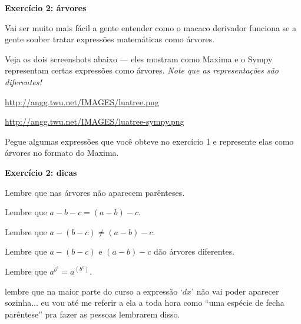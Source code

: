 \documentclass[oneside,12pt]{article}
\begin{document}
\newpage


{\bf Exercício 2: árvores}

\ssk

Vai ser muito mais fácil a gente entender como o macaco derivador
funciona se a gente souber tratar expressões matemáticas como árvores.

Veja os dois screenshots abaixo --- eles mostram como Maxima e o Sympy
representam certas expressões como árvores. {\sl Note que as
  representações são diferentes!}

\ssk


\url{http://angg.twu.net/IMAGES/luatree.png}

\url{http://angg.twu.net/IMAGES/luatree-sympy.png}

\ssk

Pegue algumas expressões que você obteve no exercício 1 e represente
elas como árvores no formato do Maxima.


\newpage


{\bf Exercício 2: dicas}

\ssk

Lembre que nas árvores não aparecem parênteses.

Lembre que $a-b-c = (a-b)-c$.

Lembre que $a-(b-c) ≠ (a-b)-c$.

Lembre que $a-(b-c)$ e $(a-b)-c$ dão árvores diferentes.

Lembre que $a^{b^c} = a^{(b^c)}$.

\bsk

 lembre que na maior parte do curso a
expressão `$dx$' não vai poder aparecer sozinha... eu vou até me
referir a ela a toda hora como ``uma espécie de fecha parêntese'' pra
fazer as pessoas lembrarem disso.


\newpage

\end{document}

